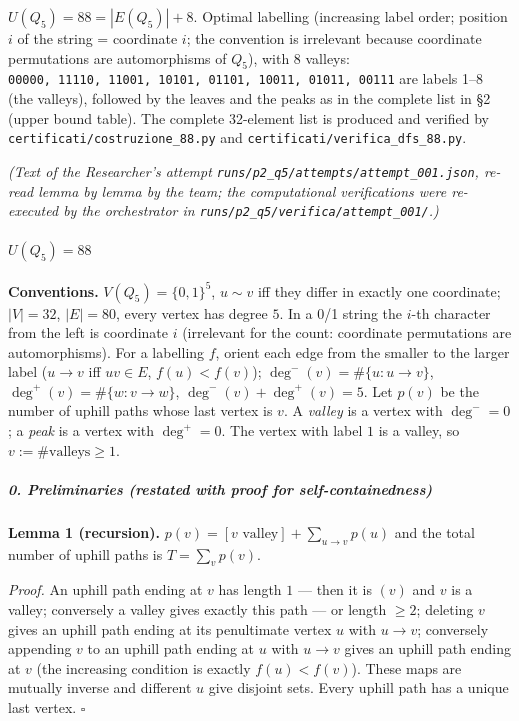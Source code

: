 
\(U(Q_5) = 88 = |E(Q_5)| + 8\). Optimal labelling (increasing label
order; position \(i\) of the string = coordinate \(i\); the convention
is irrelevant because coordinate permutations are automorphisms of
\(Q_5\)), with 8 valleys:
\texttt{00000,\ 11110,\ 11001,\ 10101,\ 01101,\ 10011,\ 01011,\ 00111}
are labels 1--8 (the valleys), followed by the leaves and the peaks as
in the complete list in §2 (upper bound table). The complete 32-element
list is produced and verified by \texttt{certificati/costruzione\_88.py}
and \texttt{certificati/verifica\_dfs\_88.py}.


\emph{(Text of the Researcher's attempt
\texttt{runs/p2\_q5/attempts/attempt\_001.json}, re-read lemma by lemma
by the team; the computational verifications were re-executed by the
orchestrator in \texttt{runs/p2\_q5/verifica/attempt\_001/}.)}

\paragraph{\texorpdfstring{\(U(Q_5) = 88\)}{U(Q\_5) = 88}}\label{uq_5-88}

\textbf{Conventions.} \(V(Q_5)=\{0,1\}^5\), \(u\sim v\) iff they differ
in exactly one coordinate; \(|V|=32\), \(|E|=80\), every vertex has
degree \(5\). In a 0/1 string the \(i\)-th character from the left is
coordinate \(i\) (irrelevant for the count: coordinate permutations are
automorphisms). For a labelling \(f\), orient each edge from the smaller
to the larger label (\(u\to v\) iff \(uv\in E\), \(f(u)<f(v)\));
\(\deg^-(v)=\#\{u:u\to v\}\), \(\deg^+(v)=\#\{w:v\to w\}\),
\(\deg^-(v)+\deg^+(v)=5\). Let \(p(v)\) be the number of uphill paths
whose last vertex is \(v\). A \emph{valley} is a vertex with
\(\deg^-=0\); a \emph{peak} is a vertex with \(\deg^+=0\). The vertex
with label \(1\) is a valley, so \(v:=\#\text{valleys}\ge1\).

\subparagraph{0. Preliminaries (restated with proof for
self-containedness)}\label{preliminaries-restated-with-proof-for-self-containedness}

\textbf{Lemma 1 (recursion).}
\(p(v)=[v\text{ valley}]+\sum_{u\to v}p(u)\) and the total number of
uphill paths is \(T=\sum_v p(v)\).

\emph{Proof.} An uphill path ending at \(v\) has length \(1\) --- then
it is \((v)\) and \(v\) is a valley; conversely a valley gives exactly
this path --- or length \(\ge2\); deleting \(v\) gives an uphill path
ending at its penultimate vertex \(u\) with \(u\to v\); conversely
appending \(v\) to an uphill path ending at \(u\) with \(u\to v\) gives
an uphill path ending at \(v\) (the increasing condition is exactly
\(f(u)<f(v)\)). These maps are mutually inverse and different \(u\) give
disjoint sets. Every uphill path has a unique last vertex. \(\square\)

